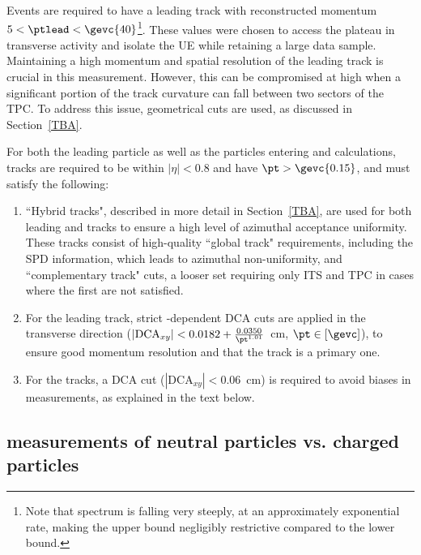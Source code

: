 Events are required to have a leading track with reconstructed momentum $5 < \ptlead < \gevc{40}$\footnote{Note that \pt spectrum is falling very steeply, at an approximately exponential rate, making the upper bound negligibly restrictive compared to the lower bound.}. These values were chosen to access the plateau in transverse activity and isolate the UE while retaining a large data sample. Maintaining a high momentum and spatial resolution of the leading track is crucial in this measurement. However, this can be compromised at high \pt when a significant portion of the track curvature can fall between two sectors of the TPC. To address this issue, geometrical cuts are used, as discussed in Section~\ref{TBA}.

For both the leading particle as well as the particles entering \NT and \RT calculations, tracks are required to be within $|\eta|<0.8$ and have $\pt > \gevc{0.15}$, and must satisfy the following:
\begin{enumerate}
\item ``Hybrid tracks", described in more detail in Section~\ref{TBA}, are used for both leading and \NT tracks to ensure a high level of azimuthal acceptance uniformity. These tracks consist of high-quality ``global track" requirements, including the SPD information, which leads to azimuthal non-uniformity, and ``complementary track" cuts, a looser set requiring only ITS and TPC in cases where the first are not satisfied.
\item  For the leading track, strict \pt-dependent DCA cuts are applied in the transverse direction ($|\mathrm{DCA}_{xy}| < 0.0182 + \frac{0.0350}{\pt^{1.01}}$~cm, $\pt \in [ \mathrm{\gevc} ]$), to ensure good momentum resolution and that the track is a primary one.
\item For the \NT tracks, a DCA cut ($|\mathrm{DCA}_{xy}| < 0.06$~cm) is required to avoid biases in \VO measurements, as explained in the text below.
\end{enumerate}

\subsection{\RT measurements of neutral particles vs. charged particles}

